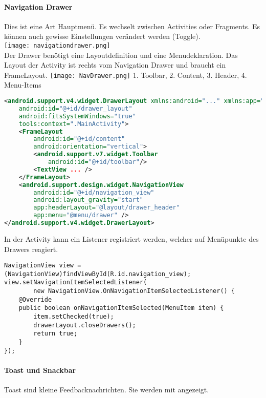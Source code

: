 \paragraph{Navigation Drawer} Dies ist eine Art Hauptmenü. Es wechselt zwischen Activities oder Fragments. Es können auch gewisse Einstellungen verändert werden (Toggle). \\
\texttt{[image: navigationdrawer.png]} \\
Der Drawer benötigt eine Layoutdefinition und eine Menudeklaration. Das Layout der Activity ist rechts vom Navigation Drawer und braucht ein FrameLayout.
\texttt{[image: NavDrawer.png]}
1. Toolbar, 2. Content, 3. Header, 4. Menu-Items
\begin{lstlisting}[language=xml]
<android.support.v4.widget.DrawerLayout xmlns:android="..." xmlns:app="..." xmlns:tools="..."
    android:id="@+id/drawer_layout"
    android:fitsSystemWindows="true"
    tools:context=".MainActivity">
    <FrameLayout
        android:id="@+id/content"
        android:orientation="vertical">
        <android.support.v7.widget.Toolbar
            android:id="@+id/toolbar"/>
        <TextView ... />
    </FrameLayout>
    <android.support.design.widget.NavigationView
        android:id="@+id/navigation_view"
        android:layout_gravity="start"
        app:headerLayout="@layout/drawer_header"
        app:menu="@menu/drawer" />
</android.support.v4.widget.DrawerLayout>
\end{lstlisting}
In der Activity kann ein Listener registriert werden, welcher auf Menüpunkte des Drawers reagiert.
\begin{lstlisting}
NavigationView view = (NavigationView)findViewById(R.id.navigation_view);
view.setNavigationItemSelectedListener(
        new NavigationView.OnNavigationItemSelectedListener() {
    @Override
    public boolean onNavigationItemSelected(MenuItem item) {
        item.setChecked(true);
        drawerLayout.closeDrawers();
        return true;
    }
});
\end{lstlisting}
\paragraph{Toast und Snackbar} Toast sind kleine Feedbacknachrichten. Sie werden mit  angezeigt.